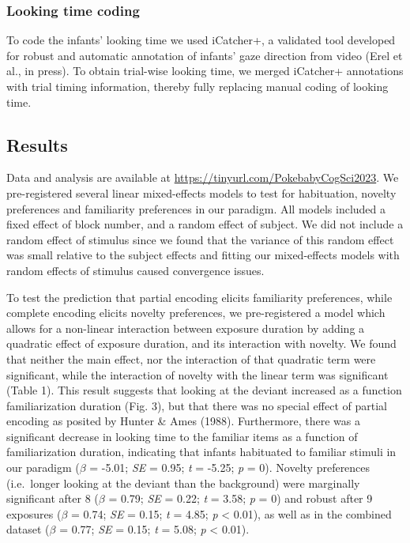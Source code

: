 \documentclass[10pt, letterpaper]{article}
\begin{document}
\hypertarget{looking-time-coding}{%
\subsubsection{Looking time coding}\label{looking-time-coding}}

To code the infants' looking time we used iCatcher+, a validated tool
developed for robust and automatic annotation of infants' gaze direction
from video (Erel et al., in press). To obtain trial-wise looking time,
we merged iCatcher+ annotations with trial timing information, thereby
fully replacing manual coding of looking time.

\hypertarget{results-1}{%
\subsection{Results}\label{results-1}}

Data and analysis are available at
\url{https://tinyurl.com/PokebabyCogSci2023}. We pre-registered several
linear mixed-effects models to test for habituation, novelty preferences
and familiarity preferences in our paradigm. All models included a fixed
effect of block number, and a random effect of subject. We did not
include a random effect of stimulus since we found that the variance of
this random effect was small relative to the subject effects and fitting
our mixed-effects models with random effects of stimulus caused
convergence issues.

To test the prediction that partial encoding elicits familiarity
preferences, while complete encoding elicits novelty preferences, we
pre-registered a model which allows for a non-linear interaction between
exposure duration by adding a quadratic effect of exposure duration, and
its interaction with novelty. We found that neither the main effect, nor
the interaction of that quadratic term were significant, while the
interaction of novelty with the linear term was significant (Table 1).
This result suggests that looking at the deviant increased as a function
familiarization duration (Fig. 3), but that there was no special effect
of partial encoding as posited by Hunter \& Ames (1988). Furthermore,
there was a significant decrease in looking time to the familiar items
as a function of familiarization duration, indicating that infants
habituated to familiar stimuli in our paradigm (\(\beta\) = -5.01;
\emph{SE} = 0.95; \emph{t} = -5.25; \emph{p} = 0). Novelty preferences
(i.e.~longer looking at the deviant than the background) were marginally
significant after 8 (\(\beta\) = 0.79; \emph{SE} = 0.22; \emph{t} =
3.58; \emph{p} = 0) and robust after 9 exposures (\(\beta\) = 0.74;
\emph{SE} = 0.15; \emph{t} = 4.85; \emph{p} \textless{} 0.01), as well
as in the combined dataset (\(\beta\) = 0.77; \emph{SE} = 0.15; \emph{t}
= 5.08; \emph{p} \textless{} 0.01).
\end{document}
